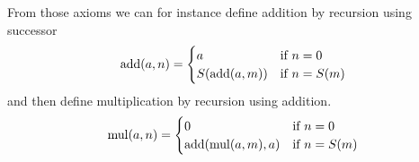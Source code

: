 From those axioms we can for instance 
define addition by recursion using successor
\begin{equation*}
  \operatorname{add}(a,n)=
  \begin{cases}
    a             &\text{if $n=0$}  \\
    S(\operatorname{add}(a,m))  &\text{if $n=S(m)$} 
  \end{cases}
\end{equation*}
and then define multiplication by recursion using addition.
\begin{equation*}
  \operatorname{mul}(a,n)=
  \begin{cases}
    0             &\text{if $n=0$}  \\
    \operatorname{add}(\operatorname{mul}(a,m),a)  &\text{if $n=S(m)$} 
  \end{cases}
\end{equation*}
